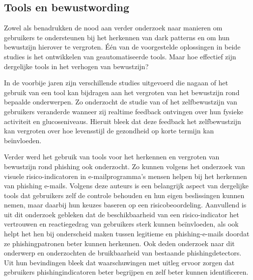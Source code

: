 \vspace{1em}

\subsection{Tools en bewustwording}
\label{subsec:tools-bewustwording}

\vspace{1em}

Zowel \textcite{DiGeronimo2020} als \textcite{Mansur2023} benadrukken de nood aan verder onderzoek naar manieren om gebruikers te ondersteunen bij het herkennen van dark patterns en om hun bewustzijn hierover te vergroten. Één van de voorgestelde oplossingen in beide studies is het ontwikkelen van geautomatiseerde tools. Maar hoe effectief zijn dergelijke tools in het verhogen van bewustzijn?

\vspace{1em}

In de voorbije jaren zijn verschillende studies uitgevoerd die nagaan of het gebruik van een tool kan bijdragen aan het vergroten van het bewustzijn rond bepaalde onderwerpen. Zo onderzocht de studie van \textcite{Whelan2021} of het zelfbewustzijn van gebruikers veranderde wanneer zij realtime feedback ontvingen over hun fysieke activiteit en glucoseniveaus. Hieruit bleek dat deze feedback het zelfbewustzijn kan vergroten over hoe levensstijl de gezondheid op korte termijn kan beïnvloeden.

\vspace{1em}

Verder werd het gebruik van tools voor het herkennen en vergroten van bewustzijn rond phishing ook onderzocht. Zo kunnen volgens het onderzoek van \textcite{Baltuttis2024} visuele risico-indicatoren in e-mailprogramma's mensen helpen bij het herkennen van phishing e-mails. Volgens deze auteurs is een belangrijk aspect van dergelijke tools dat gebruikers zelf de controle behouden en hun eigen beslissingen kunnen nemen, maar daarbij hun keuzes baseren op een risicobeoordeling. Aanvullend is uit dit onderzoek gebleken dat de beschikbaarheid van een risico-indicator het vertrouwen en reactiegedrag van gebruikers sterk kunnen beïnvloeden, als ook helpt het hen bij onderscheid maken tussen legitieme en phishing-e-mails doordat ze phishingpatronen beter kunnen herkennen. Ook \textcite{Roy2025} deden onderzoek naar dit onderwerp en onderzochten de bruikbaarheid van bestaande phishingdetectors. Uit hun bevindingen bleek dat waarschuwingen met uitleg ervoor zorgen dat gebruikers phishingindicatoren beter begrijpen en zelf beter kunnen identificeren.

